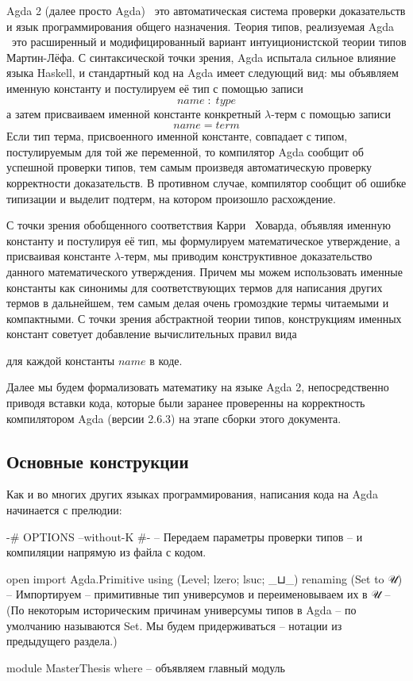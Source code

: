\documentclass{article}[12pt]
\newcommand{\dash}{\textemdash\ }
\begin{document}
Agda 2 (далее просто Agda) \dash это автоматическая система проверки доказательств и язык программирования общего назначения.
Теория типов, реализуемая Agda \dash это расширенный и модифицированный вариант интуиционистской теории типов 
Мартин-Лёфа. С синтаксической точки зрения, Agda испытала сильное влияние языка Haskell, и стандартный
код на Agda имеет следующий вид: мы объявляем именную константу и постулируем её тип с помощью записи
$$ name \; : \; type$$
а затем присваиваем именной константе конкретный $\lambda$-терм с помощью записи
$$ name = term $$
Если тип терма, присвоенного именной константе, совпадает с типом, постулируемым для той же переменной,
то компилятор Agda сообщит об успешной проверки типов, тем самым произведя автоматическую проверку корректности
доказательств. В противном случае, компилятор сообщит об ошибке типизации и выделит подтерм, на котором произошло
расхождение.

С точки зрения обобщенного соответствия Карри \dash Ховарда, объявляя именную константу и постулируя
её тип, мы формулируем математическое утверждение, а присваивая константе $\lambda$-терм,
мы приводим конструктивное доказательство данного математического утверждения. Причем мы можем
использовать именные константы как синонимы для соответствующих термов для написания
других термов в дальнейшем, тем самым делая очень громоздкие термы читаемыми и компактными.
С точки зрения абстрактной теории типов, конструкциям именных констант советует добавление вычислительных 
правил вида
\begin{prooftree}
\end{prooftree}
для каждой константы $name$ в коде.

Далее мы будем формализовать математику на языке Agda 2, непосредственно приводя вставки кода, 
которые были заранее проверенны на корректность компилятором Agda (версии 2.6.3) на этапе сборки этого документа.

\subsection{Основные конструкции}

Как и во многих других языках программирования, написания кода на Agda начинается с прелюдии:
\begin{code}
{-# OPTIONS --without-K #-} -- Передаем параметры проверки типов 
-- и компиляции напрямую из файла с кодом.

open import Agda.Primitive using (Level; lzero; lsuc; _⊔_)
                           renaming (Set to 𝒰) -- Импортируем
-- примитивные тип универсумов и переименовываем их в 𝒰
-- (По некоторым историческим причинам универсумы типов в Agda
-- по умолчанию называются Set. Мы будем придерживаться 
-- нотации из предыдущего раздела.)

module MasterThesis where -- объявляем главный модуль
\end{code}
\end{document}
